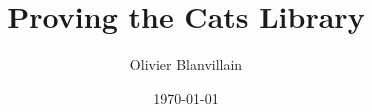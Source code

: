 \documentclass[12pt, a4paper]{article}
\title{Proving the Cats Library}
\author{Olivier Blanvillain}
\date{\today}
\begin{document}
\maketitle

\begin{abstract}

\end{abstract}



% 
% 
\end{document}
